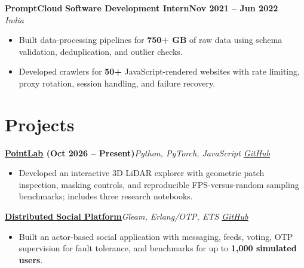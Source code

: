 \documentclass[10pt,letterpaper]{article}
\newcommand{\workEntry}[4]{%
  \textbf{#1} \textbar{} \textbf{#2}\hfill\textbf{#4}\\[-1.0pt]
  \textit{#3}\par\vspace{-1.3pt}
}
\newcommand{\projEntry}[2]{\textbf{#1}\hfill\textit{#2}\vspace{-1.0pt}}
\begin{document}
\vspace{0pt}
\workEntry{PromptCloud}{Software Development Intern}{India}{Nov 2021 -- Jun 2022}
\begin{itemize}
  \item Built data-processing pipelines for \textbf{750+ GB} of raw data using schema validation, deduplication, and outlier checks.
  \item Developed crawlers for \textbf{50+} JavaScript-rendered websites with rate limiting, proxy rotation, session handling, and failure recovery.
\end{itemize}

\section{Projects}
\projEntry{\href{https://github.com/parvathinalla/pointlab}{\underline{PointLab}} (Oct 2026 -- Present)}{Python, PyTorch, JavaScript \textbar{} \href{https://github.com/parvathinalla/pointlab}{\underline{GitHub}}}
\begin{itemize}
  \item Developed an interactive 3D LiDAR explorer with geometric patch inspection, masking controls, and reproducible FPS-versus-random sampling benchmarks; includes three research notebooks.
\end{itemize}
\vspace{0pt}
\projEntry{\href{https://github.com/parvathinalla/reddit_gleam}{\underline{Distributed Social Platform}}}{Gleam, Erlang/OTP, ETS \textbar{} \href{https://github.com/parvathinalla/reddit_gleam}{\underline{GitHub}}}
\begin{itemize}
  \item Built an actor-based social application with messaging, feeds, voting, OTP supervision for fault tolerance, and benchmarks for up to \textbf{1,000 simulated users}.
\end{itemize}
\end{document}
